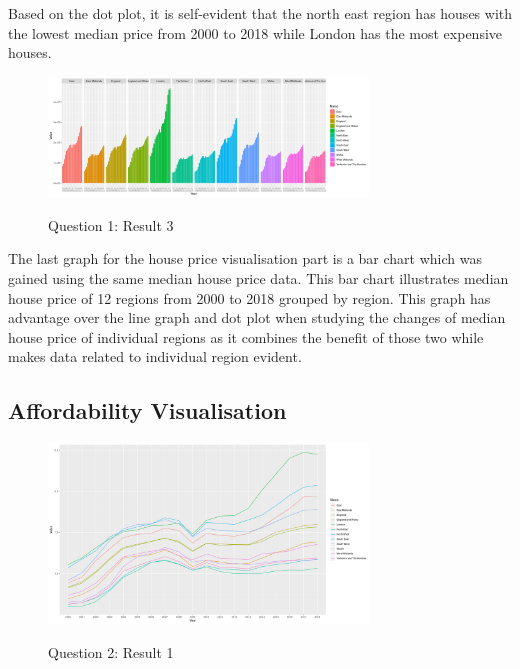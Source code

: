 \documentclass{article}
\begin{document}
Based on the dot plot, it is self-evident that the north east region has houses with the lowest median price 
from 2000 to 2018 while London has the most expensive houses.

\begin{figure}[htb]
  \begin{minipage}[b]{1.0\linewidth}
    \centering
    \centerline{\includegraphics[width=8.5cm]{Q1Geom_gridbar}}
    \centerline{Question 1: Result 3}\medskip
  \end{minipage}
\end{figure}

The last graph for the house price visualisation part is a bar chart which was gained using the same 
median house price data. This bar chart illustrates median house price of 12 regions from 2000 to 2018 
grouped by region. This graph has advantage over the line graph and dot plot when studying the changes of median house price of individual 
regions as it combines the benefit of those two while makes data related to individual region evident.



\subsection{Affordability Visualisation}

\begin{figure}[htb]
  \begin{minipage}[b]{1.0\linewidth}
    \centering
    \centerline{\includegraphics[width=8.5cm]{Q2Geom_line}}
    \centerline{Question 2: Result 1}\medskip
  \end{minipage}
\end{figure}
\end{document}
